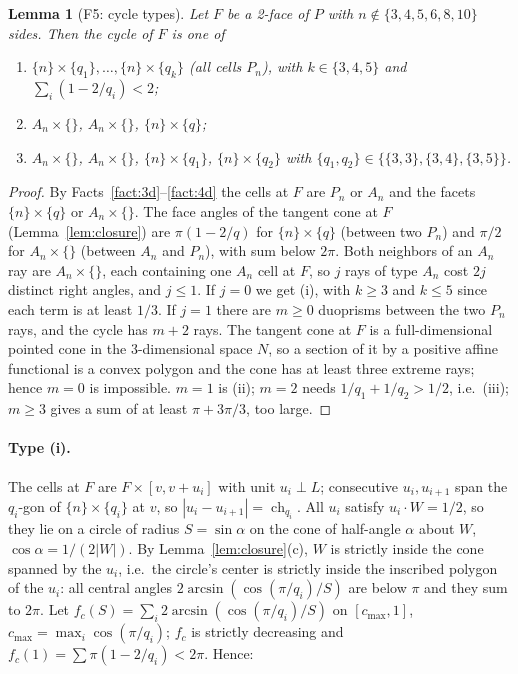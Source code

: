 \documentclass[11pt]{article}
\newtheorem{lemma}[theorem]{Lemma}
\theoremstyle{definition}
\theoremstyle{remark}
\newcommand{\ch}{\operatorname{ch}}
\begin{document}
\begin{appendices}
\begin{lemma}[F5: cycle types]\label{lem:F5}
Let $F$ be a 2-face of $P$ with $n\notin\{3,4,5,6,8,10\}$ sides. Then the
cycle of $F$ is one of
\begin{enumerate}[label=\textup{(\roman*)}]
\item $\{n\}\times\{q_1\},\dots,\{n\}\times\{q_k\}$ (all cells $P_n$), with
  $k\in\{3,4,5\}$ and $\sum_i(1-2/q_i)<2$;
\item $A_n\times\{\}$, $A_n\times\{\}$, $\{n\}\times\{q\}$;
\item $A_n\times\{\}$, $A_n\times\{\}$, $\{n\}\times\{q_1\}$,
  $\{n\}\times\{q_2\}$ with $\{q_1,q_2\}\in\{\{3,3\},\{3,4\},\{3,5\}\}$.
\end{enumerate}
\end{lemma}
\begin{proof}
By Facts~\ref{fact:3d}--\ref{fact:4d} the cells at $F$ are $P_n$ or $A_n$ and the facets
$\{n\}\times\{q\}$ or $A_n\times\{\}$. The face angles of the tangent cone
at $F$ (Lemma~\ref{lem:closure}) are $\pi(1-2/q)$ for $\{n\}\times\{q\}$
(between two $P_n$) and $\pi/2$ for $A_n\times\{\}$ (between $A_n$ and
$P_n$), with sum below $2\pi$. Both neighbors of an $A_n$ ray are
$A_n\times\{\}$, each containing one $A_n$ cell at $F$, so $j$ rays of type
$A_n$ cost $2j$ distinct right angles, and $j\le1$. If $j=0$ we get (i),
with $k\ge3$ and $k\le5$ since each term is at least $1/3$. If $j=1$ there
are $m\ge0$ duoprisms between the two $P_n$ rays, and the cycle has $m+2$
rays. The tangent cone at $F$ is a full-dimensional pointed cone in the
3-dimensional space $N$, so a section of it by a positive affine functional
is a convex polygon and the cone has at least three extreme rays; hence
$m=0$ is impossible. $m=1$ is (ii); $m=2$ needs $1/q_1+1/q_2>1/2$, i.e.\
(iii); $m\ge3$ gives a sum of at least $\pi+3\pi/3$, too large.
\end{proof}

\label{sec:radii}
\paragraph{Type (i).} The cells at $F$ are $F\times[v,v+u_i]$ with unit
$u_i\perp L$; consecutive $u_i,u_{i+1}$ span the $q_i$-gon of
$\{n\}\times\{q_i\}$ at $v$, so $|u_i-u_{i+1}|=\ch_{q_i}$. All $u_i$ satisfy
$u_i\cdot W=1/2$, so they lie on a circle of radius $S=\sin\alpha$ on the
cone of half-angle $\alpha$ about $W$, $\cos\alpha=1/(2|W|)$. By
Lemma~\ref{lem:closure}(c), $W$ is strictly inside the cone spanned by the
$u_i$, i.e.\ the circle's center is strictly inside the inscribed polygon of
the $u_i$: all central angles $2\arcsin(\cos(\pi/q_i)/S)$ are below $\pi$
and they sum to $2\pi$. Let
$f_c(S)=\sum_i2\arcsin(\cos(\pi/q_i)/S)$ on $[c_{\max},1]$,
$c_{\max}=\max_i\cos(\pi/q_i)$; $f_c$ is strictly decreasing and
$f_c(1)=\sum\pi(1-2/q_i)<2\pi$. Hence:


\end{appendices}
\end{document}
